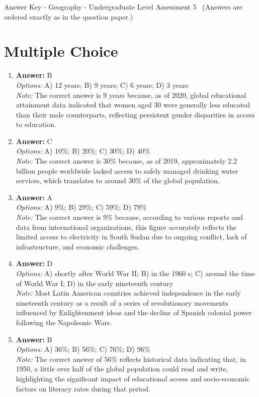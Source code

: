 \documentclass[12pt]{article}
\begin{document}
\begin{center}
Answer Key - Geography - Undergraduate Level Assessment 5 \
\small (Answers are ordered exactly as in the question paper.)
\end{center}

\section*{Multiple Choice}
\begin{enumerate}[label=\arabic*.]
\item \textbf{Answer:} B
\\ \textit{Options:} A) 12 years; B) 9 years; C) 6 years; D) 3 years
\\ \textit{Note:} The correct answer is 9 years because, as of 2020, global educational attainment data indicated that women aged 30 were generally less educated than their male counterparts, reflecting persistent gender disparities in access to education.
\item \textbf{Answer:} C
\\ \textit{Options:} A) 10\%; B) 20\%; C) 30\%; D) 40\%
\\ \textit{Note:} The correct answer is 30\% because, as of 2019, approximately 2.2 billion people worldwide lacked access to safely managed drinking water services, which translates to around 30\% of the global population.
\item \textbf{Answer:} A
\\ \textit{Options:} A) 9\%; B) 29\%; C) 59\%; D) 79\%
\\ \textit{Note:} The correct answer is 9\% because, according to various reports and data from international organizations, this figure accurately reflects the limited access to electricity in South Sudan due to ongoing conflict, lack of infrastructure, and economic challenges.
\item \textbf{Answer:} D
\\ \textit{Options:} A) shortly after World War II; B) in the 1960 s; C) around the time of World War I; D) in the early nineteenth century
\\ \textit{Note:} Most Latin American countries achieved independence in the early nineteenth century as a result of a series of revolutionary movements influenced by Enlightenment ideas and the decline of Spanish colonial power following the Napoleonic Wars.
\item \textbf{Answer:} B
\\ \textit{Options:} A) 36\%; B) 56\%; C) 76\%; D) 96\%
\\ \textit{Note:} The correct answer of 56\% reflects historical data indicating that, in 1950, a little over half of the global population could read and write, highlighting the significant impact of educational access and socio-economic factors on literacy rates during that period.
\end{enumerate}
\end{document}

